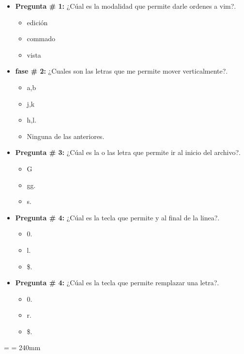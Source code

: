 \documentclass[a4paper,12pt,spanish]{article}
\begin{document}
\begin{itemize}
\item \textbf{Pregunta \# 1:} ¿Cúal es la modalidad que permite darle ordenes a vim?.
  \begin{itemize}
  \item  edición
  \item commado
  \item vista
  \end{itemize}
\item \textbf{fase \# 2:} ¿Cuales son las letras que me permite mover verticalmente?.
  \begin{itemize}
  \item a,b
  \item j,k
  \item h,l.
  \item Ninguna de las anteriores.
  \end{itemize}
\item \textbf{Pregunta \# 3:} ¿Cúal es la o las  letra que permite ir al inicio del archivo?.
  \begin{itemize}
  \item G
  \item gg.
  \item s. 
  \end{itemize}
\item \textbf{Pregunta \# 4:} ¿Cúal es la tecla que permite y al final de la linea?.
  \begin{itemize}
  \item 0.
  \item l.
  \item \$.
    \end{itemize}
\item \textbf{Pregunta \# 4:} ¿Cúal es la tecla que permite remplazar una letra?.
  \begin{itemize}
  \item 0.
  \item r.
  \item \$.

  \end{itemize}
\end{itemize}




\pdfpagewidth=297mm   %
\pdfpageheight=210mm %
\textwidth=250mm
\textheight=190mm
\headwidth=\textwidth
\linewidth= 240mm
\end{document}
